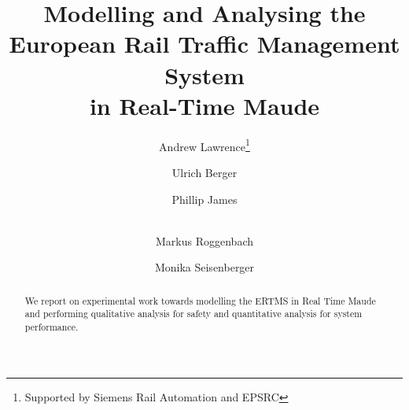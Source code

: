 \documentclass[runningheads,a4paper]{llncs}
\begin{document}
\mainmatter  %
\title{Modelling and Analysing the European Rail Traffic Management System\\in Real-Time Maude}
%
%
\author{Andrew Lawrence\thanks{Supported by Siemens Rail Automation and EPSRC} \and Ulrich Berger \and Phillip James \and \\ Markus Roggenbach \and  Monika Seisenberger}
%
%
%

\maketitle

\begin{abstract}
We report on experimental work towards modelling the ERTMS in Real
Time Maude and performing qualitative analysis for safety and
quantitative analysis for system performance.
\end{abstract}
\end{document}
